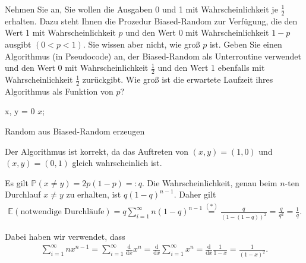 
\begin{exercise}

\phantom{}Nehmen Sie an, Sie wollen die Ausgaben 0 und 1 mit Wahrscheinlichkeit je $\frac{1}{2}$ erhalten. Dazu steht Ihnen die Prozedur Biased-Random zur Verfügung, die den Wert 1 mit Wahrscheinlichkeit $p$ und den Wert 0 mit Wahrscheinlichkeit $1-p$ ausgibt $(0 < p < 1)$. Sie wissen aber nicht, wie groß $p$ ist. Geben Sie einen Algorithmus (in Pseudocode) an, der Biased-Random als Unterroutine verwendet und den Wert 0 mit Wahrscheinlichkeit $\frac{1}{2}$ und den Wert 1 ebenfalls mit Wahrscheinlichkeit $\frac{1}{2}$ zurückgibt. Wie groß ist die erwartete Laufzeit ihres Algorithmus als Funktion von $p$?

\end{exercise}



\begin{solution}

\phantom{}\begin{algorithm}[H]
\SetAlgoLined
x, y = 0\;
\Return $x$;
    \caption{Random aus Biased-Random erzeugen}
\end{algorithm}

Der Algorithmus ist \glqq korrekt\grqq{}, da das Auftreten von $(x, y) = (1, 0)$ und $(x, y) = (0, 1)$ gleich wahrscheinlich ist.

Es gilt $\mathbb P(x \neq y) = 2p(1-p) =\colon q$. Die Wahrscheinlichkeit, genau beim $n$-ten Durchlauf $x \neq y$ zu erhalten, ist $q (1-q)^{n-1}$. Daher gilt
\begin{align*}
    \mathbb E(\text{notwendige Durchläufe}) = q \sum_{i = 1}^\infty n (1-q)^{n-1} \stackrel{(\ast)}{=} \frac{q}{(1-(1-q))^2} = \frac{q}{q^2} = \frac{1}{q}.
\end{align*}

Dabei haben wir verwendet, dass
\begin{align}\tag{$\ast$}
    \sum_{i = 1}^\infty nx^{n-1} = \sum_{i = 1}^\infty \frac{\mathrm d}{\mathrm dx} x^n =
    \frac{\mathrm d}{\mathrm dx} \sum_{i = 1}^\infty x^n =
    \frac{\mathrm d}{\mathrm dx} \frac{1}{1-x} = \frac{1}{(1-x)^2}.
\end{align}

\end{solution}
